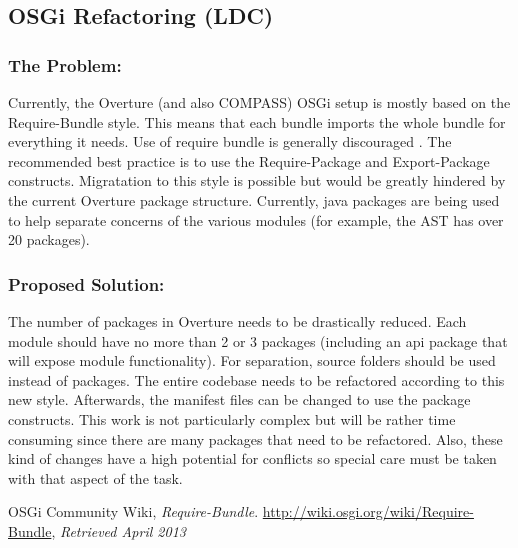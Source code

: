 \documentclass[11pt]{report}
\begin{document}
    


    \subsection*{OSGi Refactoring (LDC)}
    \label{ssec:osgi} 

    \subsubsection{The Problem:}
    Currently, the Overture (and also COMPASS) OSGi setup is mostly based on the 
    \textsf{Require-Bundle} style. This means that each bundle imports the whole 
    bundle for everything it needs. Use of require bundle is generally discouraged
    \cite{osgi2013}. The recommended best practice is to use the 
    \textsf{Require-Package} and \textsf{Export-Package} constructs. Migratation
    to this style is possible but would be greatly hindered by the current Overture
    package structure. Currently, java packages are being used to help separate
    concerns of the various modules (for example, the AST has over 20 packages).

    \subsubsection{Proposed Solution:}
    The number of packages in Overture needs to be drastically reduced. Each
    module should have no more than 2 or 3 packages (including an api package
    that will expose module functionality). For separation, source folders
    should be used instead of packages. The entire codebase needs to be
    refactored according to this new style. Afterwards, the manifest files can
    be changed to use the package constructs. This work is not particularly
    complex but will be rather time consuming since there are many packages
    that need to be refactored. Also, these kind of changes have a high
    potential for conflicts so special care must be taken with that aspect of
    the task.




    \begin{thebibliography}{9}

  OSGi Community Wiki,
  \emph{Require-Bundle}.
  \url{http://wiki.osgi.org/wiki/Require-Bundle},
  \emph{Retrieved April 2013}

\end{thebibliography}
\end{document}
